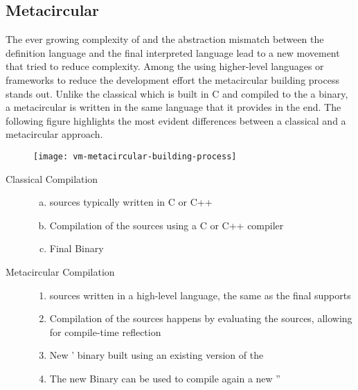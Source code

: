 \subsection{Metacircular \VMs}
The ever growing complexity of \VMs and the abstraction mismatch between the \VM definition language and the final interpreted language lead to a new movement that tried to reduce complexity.
Among the \VMs using higher-level languages or frameworks to reduce the development effort the metacircular building process stands out.
Unlike the classical \VM which is built in C and compiled to the a binary, a metacircular \VM is written in the same language that it provides in the end.
The following figure highlights the most evident differences between a classical and a metacircular approach.
%
\begin{figure}[h]
	\centering
	\vspace{1mm}
	\texttt{[image: vm-metacircular-building-process]}
	\vspace{-5mm}
\end{figure}
%
\begin{description}
\item[Classical \VM Compilation] \hfill
	\begin{enumerate}[a), nolistsep]
		\item \VM sources typically written in C or C++
		\item Compilation of the \VM sources using a C or C++ compiler
		\item Final Binary
	\end{enumerate}

\item[Metacircular \VM Compilation] \hfill
	\begin{enumerate}[nolistsep]
		\item \VM sources written in a high-level language, the same as the final \VM supports
		\item Compilation of the \VM sources happens by evaluating the \VM sources, allowing for compile-time reflection
		\item New \VM' binary built using an existing version of the \VM
		\item The new \VM Binary can be used to compile again a new \VM''
	\end{enumerate}
\end{description}

